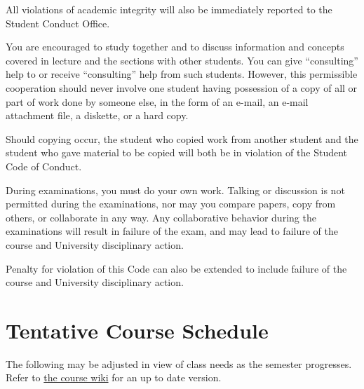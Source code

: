 \documentclass[a4paper]{article}
\begin{document}
All violations of academic integrity will also be immediately reported to the Student Conduct Office.  

You are encouraged to study together and to discuss information and concepts covered in lecture and the sections with other students. You can give ``consulting'' help to or receive ``consulting'' help from such students. However, this permissible cooperation should never involve one student having possession of a copy of all or part of work done by someone else, in the form of an e-mail, an e-mail attachment file, a diskette, or a hard copy. 

Should copying occur, the student who copied work from another student and the student who gave material to be copied will both be in violation of the Student Code of Conduct. 

During examinations, you must do your own work. Talking or discussion is not permitted during the examinations, nor may you compare papers, copy from others, or collaborate in any way. Any collaborative behavior during the examinations will result in failure of the exam, and may lead to failure of the course and University disciplinary action.

Penalty for violation of this Code can also be extended to include failure of the course and University disciplinary action. 

\newpage
\section{Tentative Course Schedule}

The following may be adjusted in view of class needs as the semester progresses. Refer to \href{https://lms.habib.edu.pk/portal/site/4d8a039a-d54a-4c25-a8e7-1b55ff695a86/page/72961ceb-2733-402e-97fe-e48f87c22a9c}{the course wiki} for an up to date version.
\end{document}
